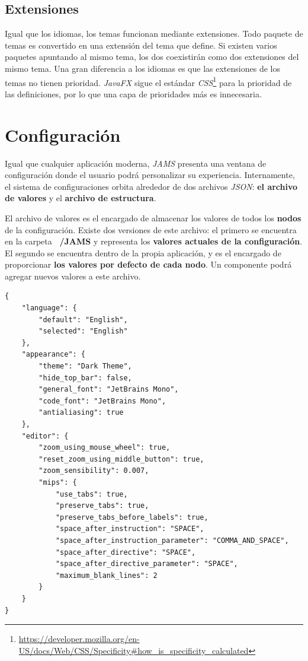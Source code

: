 \subsection{Extensiones}\label{subsec:temas-extensiones}

Igual que los idiomas, los temas funcionan mediante extensiones.
Todo paquete de temas es convertido en una extensión del tema que define.
Si existen varios paquetes apuntando al mismo tema, los dos coexistirán
como dos extensiones del mismo tema.
Una gran diferencia a los idiomas es que las extensiones de los temas
no tienen prioridad.
\textit{JavaFX} sigue el estándar
\textit{CSS}\footnote{\url{https://developer.mozilla.org/en-US/docs/Web/CSS/Specificity\#how_is_specificity_calculated}}
para la prioridad de las definiciones,
por lo que una capa de prioridades más es innecesaria.


\section{Configuración}\label{sec:configuracion}

Igual que cualquier aplicación moderna, \textit{JAMS} presenta una
ventana de configuración donde el usuario podrá personalizar su experiencia.
Internamente, el sistema de configuraciones orbita alrededor de dos archivos \textit{JSON}:
\textbf{el archivo de valores} y el \textbf{archivo de estructura}.

\noindent El archivo de valores es el encargado de almacenar los valores de
todos los \textbf{nodos} de la configuración.
Existe dos versiones de este archivo:
el primero se encuentra en la carpeta \textbf{~/JAMS} y representa los \textbf{valores
actuales de la configuración}.
El segundo se encuentra dentro de la propia aplicación, y es el encargado de
proporcionar \textbf{los valores por defecto de cada nodo}.
Un componente podrá agregar nuevos valores a este archivo.

\begin{lstlisting}[frame=single,label={lst:main_config.json}]
{
    "language": {
        "default": "English",
        "selected": "English"
    },
    "appearance": {
        "theme": "Dark Theme",
        "hide_top_bar": false,
        "general_font": "JetBrains Mono",
        "code_font": "JetBrains Mono",
        "antialiasing": true
    },
    "editor": {
        "zoom_using_mouse_wheel": true,
        "reset_zoom_using_middle_button": true,
        "zoom_sensibility": 0.007,
        "mips": {
            "use_tabs": true,
            "preserve_tabs": true,
            "preserve_tabs_before_labels": true,
            "space_after_instruction": "SPACE",
            "space_after_instruction_parameter": "COMMA_AND_SPACE",
            "space_after_directive": "SPACE",
            "space_after_directive_parameter": "SPACE",
            "maximum_blank_lines": 2
        }
    }
}
\end{lstlisting}

